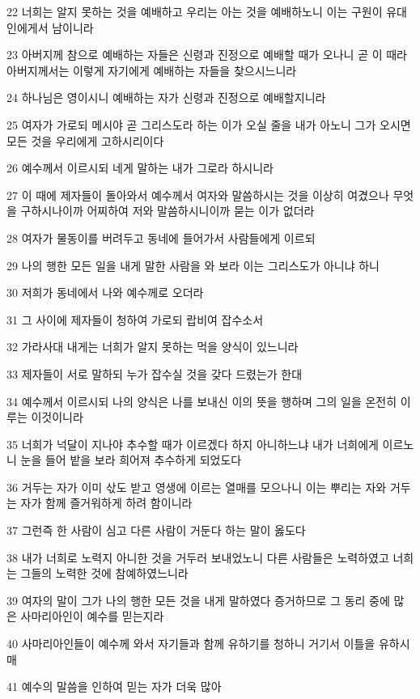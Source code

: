 \par 22 너희는 알지 못하는 것을 예배하고 우리는 아는 것을 예배하노니 이는 구원이 유대인에게서 남이니라
\par 23 아버지께 참으로 예배하는 자들은 신령과 진정으로 예배할 때가 오나니 곧 이 때라 아버지께서는 이렇게 자기에게 예배하는 자들을 찾으시느니라
\par 24 하나님은 영이시니 예배하는 자가 신령과 진정으로 예배할지니라
\par 25 여자가 가로되 메시야 곧 그리스도라 하는 이가 오실 줄을 내가 아노니 그가 오시면 모든 것을 우리에게 고하시리이다
\par 26 예수께서 이르시되 네게 말하는 내가 그로라 하시니라
\par 27 이 때에 제자들이 돌아와서 예수께서 여자와 말씀하시는 것을 이상히 여겼으나 무엇을 구하시나이까 어찌하여 저와 말씀하시니이까 묻는 이가 없더라
\par 28 여자가 물동이를 버려두고 동네에 들어가서 사람들에게 이르되
\par 29 나의 행한 모든 일을 내게 말한 사람을 와 보라 이는 그리스도가 아니냐 하니
\par 30 저희가 동네에서 나와 예수께로 오더라
\par 31 그 사이에 제자들이 청하여 가로되 랍비여 잡수소서
\par 32 가라사대 내게는 너희가 알지 못하는 먹을 양식이 있느니라
\par 33 제자들이 서로 말하되 누가 잡수실 것을 갖다 드렸는가 한대
\par 34 예수께서 이르시되 나의 양식은 나를 보내신 이의 뜻을 행하며 그의 일을 온전히 이루는 이것이니라
\par 35 너희가 넉달이 지나야 추수할 때가 이르겠다 하지 아니하느냐 내가 너희에게 이르노니 눈을 들어 밭을 보라 희어져 추수하게 되었도다
\par 36 거두는 자가 이미 삯도 받고 영생에 이르는 열매를 모으나니 이는 뿌리는 자와 거두는 자가 함께 즐거워하게 하려 함이니라
\par 37 그런즉 한 사람이 심고 다른 사람이 거둔다 하는 말이 옳도다
\par 38 내가 너희로 노력지 아니한 것을 거두러 보내었노니 다른 사람들은 노력하였고 너희는 그들의 노력한 것에 참예하였느니라
\par 39 여자의 말이 그가 나의 행한 모든 것을 내게 말하였다 증거하므로 그 동리 중에 많은 사마리아인이 예수를 믿는지라
\par 40 사마리아인들이 예수께 와서 자기들과 함께 유하기를 청하니 거기서 이틀을 유하시매
\par 41 예수의 말씀을 인하여 믿는 자가 더욱 많아
